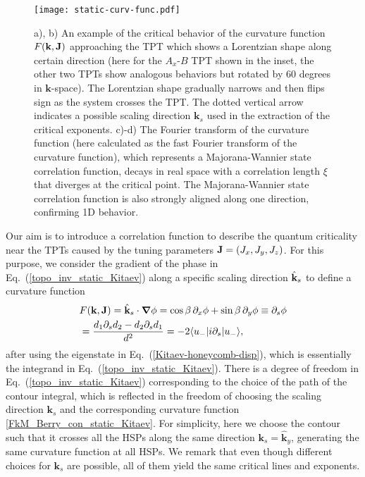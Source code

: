 \documentclass[aps,prb,twocolumn,superscriptaddress,groupedaddress]{revtex4}
\begin{document}
\begin{figure}
\centering
\texttt{[image: static-curv-func.pdf]}
\caption{a), b) An example of the critical behavior of the curvature function $F({\bf k},{\bf J})$ approaching the TPT which shows a Lorentzian shape along certain direction (here for the $A_x$-$B$ TPT shown in the inset, the other two TPTs show analogous behaviors but rotated by 60 degrees in $\mathbf{k}$-space). 
The Lorentzian shape gradually narrows and then flips sign as the system crosses the TPT. 
The dotted vertical arrow indicates a possible scaling direction $\mathbf{k}_s$ used in the extraction of the critical exponents.
c)-d) The Fourier transform of the curvature function (here calculated as the fast Fourier transform of the curvature function), which represents a Majorana-Wannier state correlation function, decays in real space with a correlation length $\xi$ that diverges at the critical point.
The Majorana-Wannier state correlation function is also strongly aligned along one direction, confirming 1D behavior.} 
\label{fig:static_Kitaev_FkM_corr}
\end{figure}


Our aim is to introduce a correlation function to describe the quantum criticality near the TPTs caused by the tuning parameters ${\bf J}=(J_{x},J_{y},J_{z})$. For this purpose, we consider the gradient of the phase in Eq.~(\ref{topo_inv_static_Kitaev}) along a specific scaling direction ${\hat{\bf k}}_{s}$ to define a curvature function~\cite{vonGersdorff:2021} 
\begin{eqnarray}
&F({\bf k},{\bf J})={\hat{\bf k}}_{s}\cdot{\boldsymbol\nabla}\phi=\cos\beta\,\partial_{x}\phi+\sin\beta\,\partial_{y}\phi\equiv\partial_{s}\phi
\nonumber \\
&=\frac{d_{1}\partial_{s}d_{2}-d_{2}\partial_{s}d_{1}}{d^{2}}=-2\langle u_{-}|i\partial_{s}|u_{-}\rangle,
\label{FkM_Berry_con_static_Kitaev}
\end{eqnarray}
after using the eigenstate in Eq.~(\ref{Kitaev-honeycomb-disp}), which is essentially the integrand in Eq.~(\ref{topo_inv_static_Kitaev}).
There is a degree of freedom in Eq.~(\ref{topo_inv_static_Kitaev}) corresponding to the choice of the path of the contour integral, which is reflected in the freedom of choosing the scaling direction $\mathbf{k}_s$ and the corresponding curvature function \eqref{FkM_Berry_con_static_Kitaev}.
For simplicity, here we choose the contour such that it crosses all the HSPs along the same direction $\mathbf{k}_s = \hat{\mathbf{k}}_y$, generating the same curvature function at all HSPs.
We remark that even though different choices for $\mathbf{k}_s$ are possible, all of them yield the same critical lines and exponents.
\end{document}
